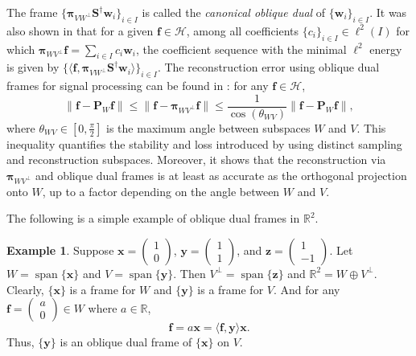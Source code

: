 \documentclass{amsart}
\numberwithin{equation}{section}
\DeclareMathOperator{\spanning}{span}
\newcommand{\bP}{{\mathbf P}}
\newcommand{\bpi}{{\boldsymbol{\pi}}}
\theoremstyle{plain}
\theoremstyle{remark}
\theoremstyle{definition}
\newtheorem{example}[theorem]{Example}
\begin{document}
The frame $\{\bpi_{VW^\perp} \mathbf{S}^\dagger \mathbf{w}_i\}_{i\in I}$ is called the \emph{canonical oblique dual} of $\{\mathbf{w}_i\}_{i\in I}$. It was also shown in \cite{eldar2003sampling,christensen2004oblique,eldar2005general} that for a given $\mathbf{f} \in \mathcal{H}$, among all coefficients 
$\{c_i\}_{i\in I} \in \ell^2(I)$ for which $
\bpi_{WV^\perp} \mathbf{f} = \sum_{i\in I} c_i \mathbf{w}_i$,
the coefficient sequence with the minimal $\ell^2$ energy is given by $\{\langle \mathbf{f}, \bpi_{VW^\perp} \mathbf{S}^\dagger \mathbf{w}_i\rangle\}_{i\in I}$.
The reconstruction error using oblique dual frames for signal processing can be found in \cite{unser2002general, unser2002generalized, eldar2003sampling, berger2019sampling}: for any $\mathbf{f} \in \mathcal{H}$, 
\begin{equation*}
\| \mathbf{f} - \bP_{W} \mathbf{f} \| \leq \| \mathbf{f} - \bpi_{WV^\perp} \mathbf{f} \|
\leq \frac{1}{\cos(\theta_{WV})} \| \mathbf{f} - \bP_{W} \mathbf{f} \|,
\end{equation*}
where $\theta_{WV} \in [0, \frac{\pi}{2}]$ is the maximum angle between subspaces $W$ and $V$.
This inequality quantifies the stability and loss introduced by using distinct sampling and reconstruction subspaces. Moreover, it shows that the reconstruction via $\bpi_{W V^\perp}$ and oblique dual frames is at least as accurate as the orthogonal projection onto $W$, up to a factor depending on the angle between $W$ and $V$. 


The following is a simple example of oblique dual frames in $\mathbb{R}^2$.
\begin{example}
Suppose $\mathbf{x} = \begin{pmatrix}
        1 \\0
    \end{pmatrix}$, $\mathbf{y} = \begin{pmatrix}
        1 \\1
    \end{pmatrix}$, and $\mathbf{z} = \begin{pmatrix}
        1 \\-1
    \end{pmatrix}$.
    Let $W = \spanning\{\mathbf{x}\}$ and $V = \spanning\{\mathbf{y}\}$. Then $V^\perp = \spanning\{\mathbf{z}\}$ and $\mathbb{R}^2 = W \oplus V^\perp$. Clearly, $\{\mathbf{x}\}$ is a frame for $W$ and $\{\mathbf{y}\}$ is a frame for $V$. And for any $\mathbf{f} = \begin{pmatrix}
        a \\0
    \end{pmatrix} \in W$ where $a \in \mathbb{R}$, 
    \begin{equation*}
        \mathbf{f} = a \mathbf{x}= \langle \mathbf{f}, \mathbf{y} \rangle \mathbf{x}.
    \end{equation*}
Thus, $\{\mathbf{y}\}$ is an oblique dual frame of $\{\mathbf{x}\}$ on $V$. 
\end{example}
\end{document}
